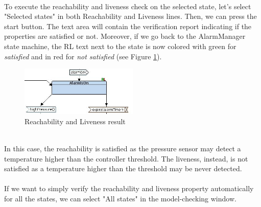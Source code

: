 \documentclass[12pt]{article}
\begin{document}
\\To execute the reachability and liveness check on the selected state, let's select "Selected states" in both Reachability and Liveness lines. Then, we can press the start button. The text area will contain the verification report indicating if the properties are satisfied or not. Moreover, if we go back to the AlarmManager state machine, the RL text next to the state is now colored with green for \textit{satisfied} and in red for \textit{not satisfied} (see Figure \ref{fig:rl_exe}).
\begin{figure}[h!]
\centering
\includegraphics[width=0.5\textwidth]{images/rl_exe.jpg}
\caption{Reachability and Liveness result}
\label{fig:rl_exe}
\end{figure}
\\In this case, the reachability is satisfied as the pressure sensor may detect a temperature higher than the controller threshold. The liveness, instead, is not satisfied as a temperature higher than the threshold may be never detected.
\\\\
If we want to simply verify the reachability and liveness property automatically for all the states, we can select "All states" in the model-checking window.
\end{document}

